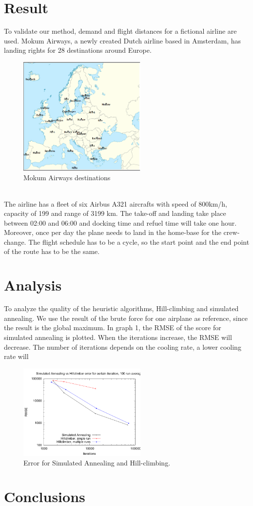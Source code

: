 \documentclass[journal]{IEEEtran}
\begin{document}
\section{Result}
To validate our method, demand and flight distances for a fictional airline are used. Mokum Airways, a newly created Dutch airline based in Amsterdam, has landing rights for 28 destinations around Europe.\\
\begin{figure}[!h]
\centering
\includegraphics[width=2.5in]{europe}
\caption{Mokum Airways destinations}
\label{fig:europe}
\end{figure}
\\
The airline has a fleet of six Airbus A321 aircrafts with speed of 800km/h, capacity of 199 and range of 3199 km.  The take-off and landing take place between 02:00 and 06:00 and docking time and refuel time will take one hour. Moreover, once per day the plane needs to land in the home-base for the crew-change. The flight schedule has to be a cycle, so the start point and the end point of the route has to be the same. \\
\section{Analysis}
To analyze the quality of the heuristic algorithms, Hill-climbing and simulated annealing. We use the result of the brute force for one airplane as reference, since the result is the global maximum. In graph 1, the RMSE of the score for simulated annealing is plotted. When the iterations increase, the RMSE will decrease. The number of iterations depends on the cooling rate, a lower cooling rate will 
\begin{figure}[!h]
\centering
\includegraphics[width=2.5in]{iterations_vs_error_sa_hc}
\caption{Error for Simulated Annealing and Hill-climbing.}
\label{fig:error_sa_hc}
\end{figure}
\section{Conclusions}


\end{document}
